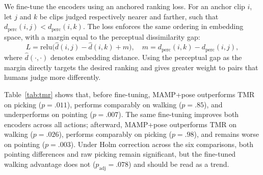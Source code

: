 \documentclass[letterpaper]{article} %
\begin{document}
We fine-tune the encoders using an anchored ranking loss. For an anchor clip $i$, let $j$ and $k$ be clips judged respectively nearer and farther, such that
$d_{\text{perc}}(i,j) < d_{\text{perc}}(i,k)$. The loss enforces the same ordering in embedding space, with a margin equal to the perceptual dissimilarity gap:
\[
L = \mathrm{relu}\!\bigl(\hat d(i,j)-\hat d(i,k)+m\bigr), \quad
m = d_{\text{perc}}(i,k)-d_{\text{perc}}(i,j),
\]
where $\hat d(\cdot,\cdot)$ denotes embedding distance. Using the perceptual gap as the margin directly targets the desired ranking and gives greater weight to pairs that humans judge more differently.

Table~\ref{tab:tmr} shows that, before fine-tuning, MAMP+pose outperforms TMR on picking ($p=.011$), performs comparably on walking ($p=.85$), and underperforms on pointing ($p=.007$). The same fine-tuning improves both encoders across all actions; afterward, MAMP+pose outperforms TMR on walking ($p=.026$), performs comparably on picking ($p=.98$), and remains worse on pointing ($p=.003$). Under Holm correction across the six comparisons, both pointing differences and raw picking remain significant, but the fine-tuned walking advantage does not ($p_{\text{adj}}=.078$) and should be read as a trend.

 
\end{document}
